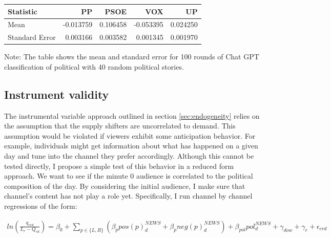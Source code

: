 \documentclass[12pt]{article}
\begin{document}
	
	\begin{table}
		
		\centering
		\begin{tabular}{lrrrr}
			\hline
			Statistic       &       PP &     PSOE &      VOX &       UP \\
			\hline
			Mean            & -0.013759 &  0.106458 & -0.053395 &  0.024250 \\
			Standard Error  &  0.003166 &  0.003582 &  0.001345 &  0.001970 \\
			\hline
			
		\end{tabular}
		
		\begin{tablenotes}
			\centering
			\footnotesize
			\item Note: The table shows the mean and standard error for 100 rounds of Chat GPT classification of political with 40 random political stories.
		\end{tablenotes}
	\end{table}
	
	
	
	
	
	\subsection{Instrument validity}
	
	
	The instrumental variable approach outlined in section \ref{sec:endogeneity} relies on the assumption that the supply shifters are uncorrelated to demand. This assumption would be violated if viewers exhibit some anticipation behavior. For example, individuals might get information about what has happened on a given day and tune into the channel they prefer accordingly. Although this cannot be tested directly, I propose a simple test of this behavior in a reduced form approach. We want to see if the minute 0 audience is correlated to the political composition of the day. By considering the initial audience, I make sure that channel's content has not play a role yet. Specifically, I run channel by channel regressions of the form: 
	
	\begin{equation}\label{eq:check_exogeneity}
		\begin{aligned}
			ln\left( \frac{q_{crd}}{L_{r}-Q_{rd}}  \right) = \beta_0 + \sum_{p \in \{L,R\}}\left(\beta_p pos(p)^{NEWS}_d + \beta_p neg(p)^{NEWS}_d \right)+ \beta_{pol} pol^{NEWS}_d + \gamma_{dow} + \gamma_r + \epsilon_{crd}
		\end{aligned}
	\end{equation} 
	
\end{document}
